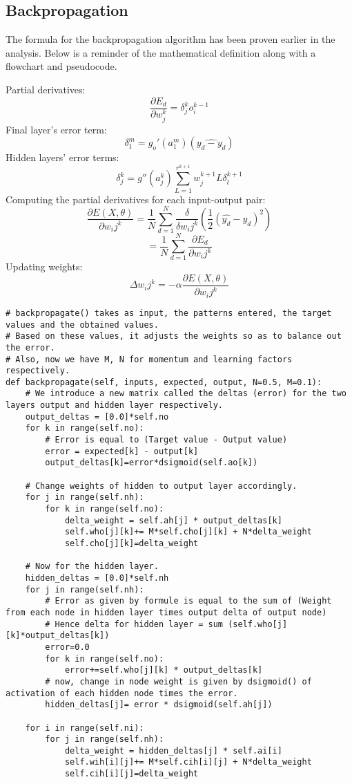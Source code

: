 \documentclass{article}
\begin{document}
\subsection{Backpropagation}
The formula for the backpropagation algorithm has been proven earlier in the analysis. Below is a reminder of the mathematical definition along with a flowchart and pseudocode.

Partial derivatives:
$$\frac{\partial{E_d}}{\partial{w_j^k}} = \delta_j^k o_i^{k-1}$$
Final layer's error term:
$$\delta_1^m = g_o'(a_1^m)(\hat{y_d-y_d})$$
Hidden layers' error terms:
$$\delta_j^k = g''(a_j^k)\sum_{L=1}^{r^{k+1}}w^{k+1}_jL\delta_l^{k+1}$$
Computing the partial derivatives for each input-output pair:
    $$\frac{\partial{E(X,\theta)}}{\partial{w_ij^k}}= \frac{1}{N}\sum_{d=1}^{N}\frac{\delta}{\delta w_ij^k}(\frac{1}{2}(\hat{y_d}-y_d)^2)$$
    $$ = \frac{1}{N}\sum_{d=1}^{N}\frac{\partial{E_d}}{\partial{w_ij^k}}$$
Updating weights:
$$ \Delta w_ij^k = -\alpha \frac{\partial{E(X,\theta)}}{\partial{w_ij^k}}$$


\begin{lstlisting}
# backpropagate() takes as input, the patterns entered, the target values and the obtained values.
# Based on these values, it adjusts the weights so as to balance out the error.
# Also, now we have M, N for momentum and learning factors respectively.
def backpropagate(self, inputs, expected, output, N=0.5, M=0.1):
	# We introduce a new matrix called the deltas (error) for the two layers output and hidden layer respectively.
	output_deltas = [0.0]*self.no
	for k in range(self.no):
		# Error is equal to (Target value - Output value)
		error = expected[k] - output[k]
		output_deltas[k]=error*dsigmoid(self.ao[k])

	# Change weights of hidden to output layer accordingly.
	for j in range(self.nh):
		for k in range(self.no):
			delta_weight = self.ah[j] * output_deltas[k]
			self.who[j][k]+= M*self.cho[j][k] + N*delta_weight
			self.cho[j][k]=delta_weight

	# Now for the hidden layer.
	hidden_deltas = [0.0]*self.nh
	for j in range(self.nh):
		# Error as given by formule is equal to the sum of (Weight from each node in hidden layer times output delta of output node)
		# Hence delta for hidden layer = sum (self.who[j][k]*output_deltas[k])
		error=0.0
		for k in range(self.no):
			error+=self.who[j][k] * output_deltas[k]
		# now, change in node weight is given by dsigmoid() of activation of each hidden node times the error.
		hidden_deltas[j]= error * dsigmoid(self.ah[j])

	for i in range(self.ni):
		for j in range(self.nh):
			delta_weight = hidden_deltas[j] * self.ai[i]
			self.wih[i][j]+= M*self.cih[i][j] + N*delta_weight
			self.cih[i][j]=delta_weight
\end{lstlisting}
\clearpage
\end{document}
